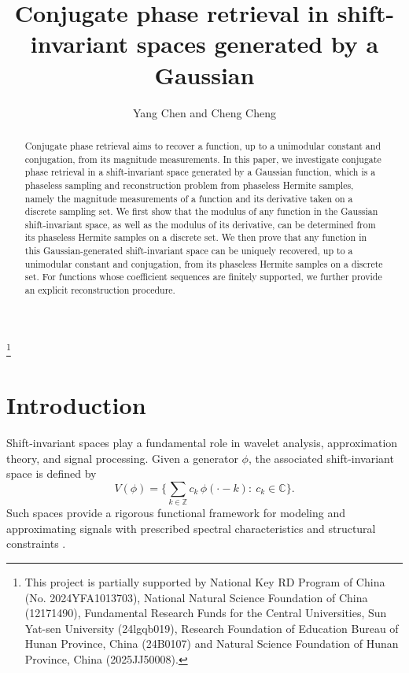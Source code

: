 \documentclass[11pt,oneside,reqno]{amsart}
\numberwithin{equation}{section}
\begin{document}
\title[]{Conjugate phase retrieval in shift-invariant spaces generated by a Gaussian}
\author{Yang Chen and Cheng Cheng  }

\address{Chen: Key Laboratory of Computing and Stochastic Mathematics (Ministry of Education), School of Mathematics and Statistics,
 Hunan Normal University, Changsha, Hunan 410081, P. R. China,
 email: ychenmath@hunnu.edu.cn}


\address{Cheng:
School of Mathematics, Sun Yat-sen University, Guangzhou, Guangdong,
510275, China, email: chengch66@mail.sysu.edu.cn}


\thanks{This project is partially supported by  National Key RD Program of China (No. 2024YFA1013703),  National Natural
Science Foundation of China (12171490),  Fundamental Research Funds for the Central Universities, Sun Yat-sen University (24lgqb019),  Research Foundation of Education Bureau of Hunan Province, China (24B0107) and  Natural
Science Foundation of Hunan Province, China (2025JJ50008).}
\maketitle
\begin{abstract}
Conjugate phase retrieval aims to recover a function, up to a unimodular constant and  conjugation, from its magnitude measurements. In this paper, we investigate conjugate phase retrieval in a shift-invariant space generated by a Gaussian function, which is a phaseless sampling and reconstruction problem from phaseless Hermite samples, namely the magnitude measurements of a function and its derivative taken on a discrete sampling set. We first show that the modulus of any function in the Gaussian shift-invariant space, as well as the modulus of its derivative, can be determined from its phaseless Hermite samples on a discrete set. We then prove that any function in this Gaussian-generated shift-invariant space can be uniquely recovered, up to a unimodular constant and conjugation, from its phaseless Hermite samples
 on a discrete set. For functions whose coefficient sequences are finitely supported, we further provide an explicit reconstruction procedure.  
\end{abstract}

\section{Introduction}

\medskip 
Shift-invariant spaces play a fundamental role in wavelet analysis,  approximation theory, and signal processing. Given a generator $\phi$, the associated shift-invariant space is defined by
\begin{equation}\label{sis.def.intro}
V(\phi)
=
\Big\{
\sum_{k\in\mathbb Z} c_k \, \phi(\cdot-k)
:\ c_k\in\mathbb C
\Big\}.
\end{equation}
Such spaces provide a rigorous functional framework for modeling and
approximating signals with prescribed spectral characteristics and structural
constraints
\cite{AG01, AST05,Christensenbook, daubechiesbook, DDR94, jia92, mallatbook,unser00}.  
\end{document}
